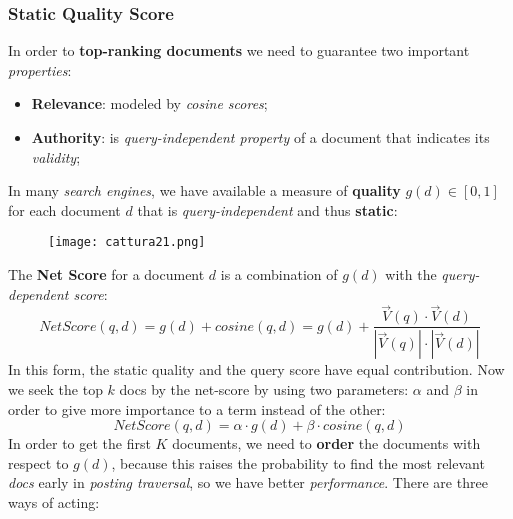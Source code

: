 \documentclass{article}
\begin{document}
\subsubsection{Static Quality Score}
In order to \textbf{top-ranking documents} we need to guarantee two important \emph{properties}:
\begin{itemize}
\item \textbf{Relevance}: modeled by \emph{cosine scores};
\item \textbf{Authority}: is \emph{query-independent property} of a document that indicates its \emph{validity};
\end{itemize}
In many \emph{search engines}, we have available a measure of \textbf{quality} $g(d) \in \left [0, 1\right ]$ for each document $d$ that is \emph{query-independent} and thus \textbf{static}:
\begin{figure}[H]
  \centering
  \texttt{[image: cattura21.png]}
\end{figure}
The\textbf{ Net Score} for a document $d$ is a combination of $g(d)$ with the \emph{query-dependent score}:
\[ NetScore(q,d) = g(d) + cosine(q,d) = g(d) + \frac{ \vec{V}(q) \cdot \vec{V}(d)}{ |\vec{V}(q)| \cdot |\vec{V}(d)|}\]
In this form, the static quality and the query score have equal contribution. Now we seek the top $k$ docs by the net-score by using two parameters: $\alpha$ and $\beta$ in order to give more importance to a term instead of the other:
\[ NetScore(q,d) = \alpha \cdot g(d) + \beta \cdot cosine(q,d)\]
In order to get the first $K$ documents, we need to \textbf{order} the documents with respect to $g(d)$, because this raises the probability to find the most relevant \emph{docs} early in \emph{posting traversal}, so we have better \emph{performance}. There are three ways of acting:
\end{document}
